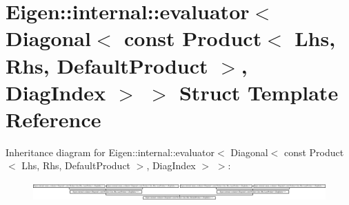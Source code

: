 \hypertarget{struct_eigen_1_1internal_1_1evaluator_3_01_diagonal_3_01const_01_product_3_01_lhs_00_01_rhs_00_0f2daf8d0d705abfd9eae463424f3e8d5}{}\section{Eigen\+:\+:internal\+:\+:evaluator$<$ Diagonal$<$ const Product$<$ Lhs, Rhs, Default\+Product $>$, Diag\+Index $>$ $>$ Struct Template Reference}
\label{struct_eigen_1_1internal_1_1evaluator_3_01_diagonal_3_01const_01_product_3_01_lhs_00_01_rhs_00_0f2daf8d0d705abfd9eae463424f3e8d5}
Inheritance diagram for Eigen\+:\+:internal\+:\+:evaluator$<$ Diagonal$<$ const Product$<$ Lhs, Rhs, Default\+Product $>$, Diag\+Index $>$ $>$\+:\begin{figure}[H]
\begin{center}
\leavevmode
\includegraphics[height=0.705882cm]{struct_eigen_1_1internal_1_1evaluator_3_01_diagonal_3_01const_01_product_3_01_lhs_00_01_rhs_00_0f2daf8d0d705abfd9eae463424f3e8d5}
\end{center}
\end{figure}
